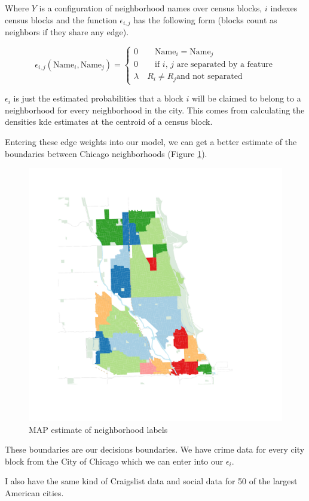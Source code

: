 \documentclass{article}
\begin{document}
Where $Y$ is a configuration of neighborhood names over census blocks,
$i$ indexes census blocks and the function $\epsilon_{i,j}$ has the
following form (blocks count as neighbors if they share any edge).

\begin{equation}
\epsilon_{i,j}(\text{Name}_i,\text{Name}_j) = \begin{cases}
  0 \quad\quad \text{Name}_i = \text{Name}_j \\
  0 \quad\quad \text{if $i$, $j$ are separated by a feature} \\
  \lambda \quad R_i \neq R_j \text{and not separated}
\end{cases}
\end{equation}

$\epsilon_i$ is just the estimated probabilities that a block $i$ will
be claimed to belong to a neighborhood for every neighborhood in the
city. This comes from calculating the densities kde estimates at the
centroid of a census block.

Entering these edge weights into our model, we can get a better estimate of
the boundaries between Chicago neighborhoods (Figure \ref{fig:graphcut}).

\begin{figure}
\includegraphics{respect_grid.pdf}
\caption{MAP estimate of neighborhood labels}
\label{fig:graphcut}
\end{figure}

These boundaries are our decisions boundaries. We have crime data for
every city block from the City of Chicago which we can enter into our
$\epsilon_i$. 

I also have the same kind of Craigslist data and social data for 50 of
the largest American cities.
\end{document}
